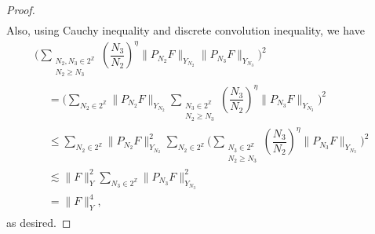 \documentclass[10pt,leqno]{amsart}
\numberwithin{equation}{section}
\newcommand{\Z}{\mathbb{Z}}
\begin{document}
\begin{proof}
\begin{align*}
\end{align*}
Also, using Cauchy inequality and discrete convolution inequality, we have 
\begin{multline*}
\Bigg( \sum_{\substack{N_2, N_3 \in 2^\Z \\ N_2 \geq  N_3}} \left(\dfrac{N_3}{N_2}\right)^{\eta}  \|P_{N_2}F\|_{Y_{N_2}} \|P_{N_3}F\|_{Y_{N_3}} \Bigg)^2  \\ 
\begin{aligned}
&=\Bigg(\sum_{N_2\in 2^\Z} \|P_{N_2}F\|_{Y_{N_2}}  \sum_{\substack{ N_3 \in 2^\Z \\ N_2 \geq  N_3}} \left(\dfrac{N_3}{N_2}\right)^{\eta}  \|P_{N_3}F\|_{Y_{N_3}} \Bigg)^2 \\
&\leq \sum_{N_2\in 2^\Z} \|P_{N_2}F\|_{Y_{N_2}}^2 \sum_{N_2\in 2^\Z} \Bigg(\sum_{\substack{N_3 \in 2^\Z \\ N_2 \geq  N_3}} \left(\dfrac{N_3}{N_2}\right)^{\eta}  \|P_{N_3}F\|_{Y_{N_3}} \Bigg)^2 \\
&\lesssim \|F\|_Y^2 \sum_{N_3\in 2^\Z}\|P_{N_3}F\|_{Y_{N_3}} ^2 \\
&= \|F\|_Y^4 ,
\end{aligned}
\end{multline*}
as desired. 
\end{proof}
\end{document}

